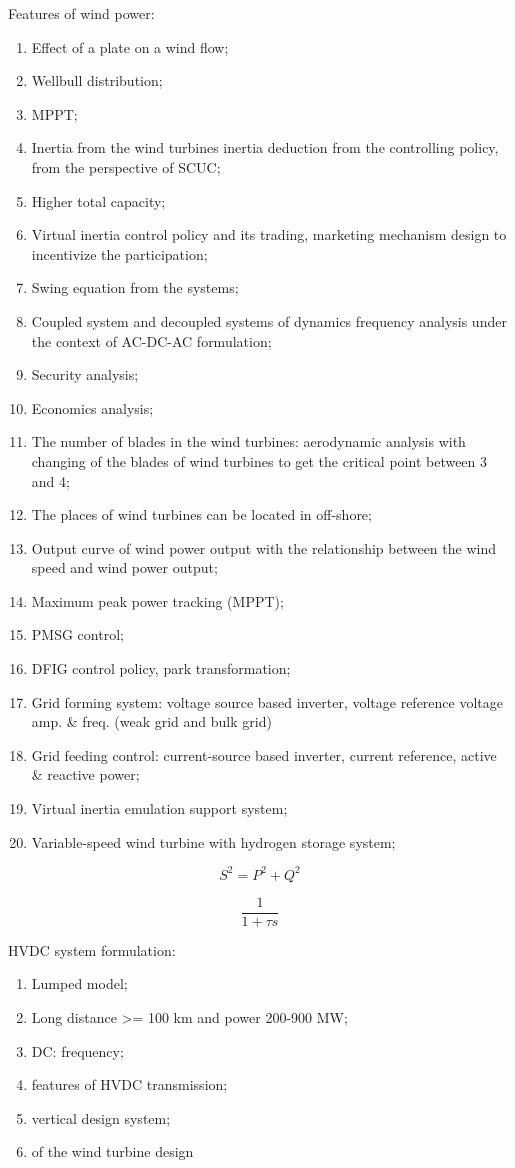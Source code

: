 \documentclass{article}
\newcommand{\slw}{\color{red}}
\begin{document}
Features of wind power:
\begin{enumerate}
  \item Effect of a plate on a wind flow;
  \item Wellbull distribution;
  \item MPPT;
  \item Inertia from the wind turbines {\slw inertia deduction from the controlling policy, from the perspective of SCUC};
  \item Higher total capacity;
  \item Virtual inertia control policy and its trading, marketing mechanism design to incentivize the participation;
  \item Swing equation from the systems;
  \item Coupled system and decoupled systems of dynamics frequency analysis under the context of AC-DC-AC formulation;
  \item Security analysis;
  \item Economics analysis;
  \item The number of blades in the wind turbines: aerodynamic analysis with changing of the blades of wind turbines to get the critical point between 3 and 4;
  \item The places of wind turbines can be located in off-shore;
  \item Output curve of wind power output with the relationship between the wind speed and wind power output;
  \item Maximum peak power tracking (MPPT);
  \item PMSG control;
  \item DFIG control policy, park transformation;
  \item Grid forming system: voltage source based inverter, voltage reference voltage amp. \& freq. (weak grid and bulk grid)
  \item Grid feeding control: current-source based inverter, current reference, active \& reactive power;
  \item Virtual inertia emulation support system;
  \item Variable-speed wind turbine with hydrogen storage system;
\end{enumerate}

$$S^2 = P^2 + Q^2$$

$$\frac{1}{1+\tau s}$$

HVDC system formulation:

\begin{enumerate}
  \item Lumped model;
  \item Long distance >= 100 km and power 200-900 MW;
  \item DC: frequency;
  \item features of HVDC transmission;
  \item vertical design system;
  \item of the wind turbine design
\end{enumerate}
\end{document}
